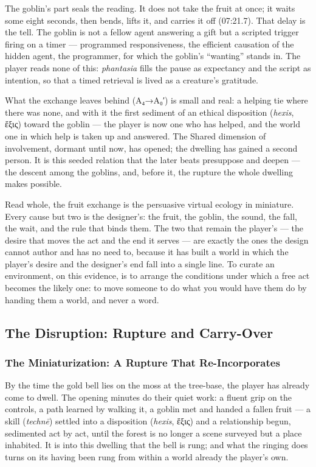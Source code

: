 \documentclass{article}
\newcommand{\gk}[1]{{\greekfont #1}}
\begin{document}
The goblin's part seals the reading. It does not take the fruit at once; it waits some eight seconds, then bends, lifts it, and carries it off (07:21.7). That delay is the tell. The goblin is not a fellow agent answering a gift but a scripted trigger firing on a timer — programmed responsiveness, the efficient causation of the hidden agent, the programmer, for which the goblin's ``wanting'' stands in. The player reads none of this: \textit{phantasia} fills the pause as expectancy and the script as intention, so that a timed retrieval is lived as a creature's gratitude.

What the exchange leaves behind (A₄→A₀′) is small and real: a helping tie where there was none, and with it the first sediment of an ethical disposition (\textit{hexis}, \gk{ἕξις}) toward the goblin — the player is now one who has helped, and the world one in which help is taken up and answered. The Shared dimension of involvement, dormant until now, has opened; the dwelling has gained a second person. It is this seeded relation that the later beats presuppose and deepen — the descent among the goblins, and, before it, the rupture the whole dwelling makes possible.

Read whole, the fruit exchange is the persuasive virtual ecology in miniature. Every cause but two is the designer's: the fruit, the goblin, the sound, the fall, the wait, and the rule that binds them. The two that remain the player's — the desire that moves the act and the end it serves — are exactly the ones the design cannot author and has no need to, because it has built a world in which the player's desire and the designer's end fall into a single line. To curate an environment, on this evidence, is to arrange the conditions under which a free act becomes the likely one: to move someone to do what you would have them do by handing them a world, and never a word.

\bigskip

\subsection*{The Disruption: Rupture and Carry-Over}

\subsubsection*{The Miniaturization: A Rupture That Re-Incorporates}

By the time the gold bell lies on the moss at the tree-base, the player has already come to dwell. The opening minutes do their quiet work: a fluent grip on the controls, a path learned by walking it, a goblin met and handed a fallen fruit — a skill (\textit{technē}) settled into a disposition (\textit{hexis}, \gk{ἕξις}) and a relationship begun, sedimented act by act, until the forest is no longer a scene surveyed but a place inhabited. It is into this dwelling that the bell is rung; and what the ringing does turns on its having been rung from within a world already the player's own.
\end{document}
